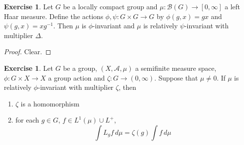 \documentclass[12pt]{amsart}
\theoremstyle{definition}
\newtheorem{ex}[definition]{Exercise}
\newcommand{\Del}{\Delta}
\newcommand{\MA}{\mathcal{A}}
\newcommand{\MB}{\mathcal{B}}
\newcommand{\dmu}{\, d \mu}
\newcommand{\RG}{[0,\infty]}
\begin{document}
	\begin{ex}
		Let $G$ be a locally compact group and $\mu: \MB(G) \rightarrow \RG$ a left Haar measure. Define the actions $\phi, \psi : G \times G \rightarrow G$ by $\phi(g, x) = gx$ and $\psi(g, x) = xg^{-1}$. Then $\mu$ is $\phi$-invariant and $\mu$ is relatively $\psi$-invariant with multiplier $\Del$. 
	\end{ex}
	
	\begin{proof}
		Clear.
	\end{proof}

	\begin{ex}
		Let $G$ be a group, $(X, \MA, \mu)$ a semifinite measure space, $\phi: G \times X \rightarrow X$ a group action and $\zeta: G \rightarrow (0, \infty)$. Suppose that $\mu \neq 0$. If $\mu$ is relatively $\phi$-invariant with multiplier $\zeta$, then 
		\begin{enumerate}
			\item $\zeta$ is a homomorphism
			\item for each $g \in G$, $f \in L^1(\mu) \cup L^+$, $$\int L_g f \dmu = \zeta(g) \int f \dmu$$ 
		\end{enumerate} 
	\end{ex}
\end{document}

